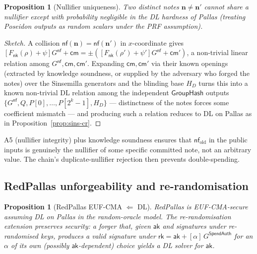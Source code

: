 \documentclass[11pt,a4paper]{article}
\newtheorem{proposition}[theorem]{Proposition}
\theoremstyle{definition}
\newcommand{\nfsym}{\mathsf{nf}}
\newcommand{\cmsym}{\mathsf{cm}}
\newcommand{\rk}{\mathsf{rk}}
\newcommand{\GroupHash}{\ensuremath{\mathsf{GroupHash}}}
\newcommand{\aksym}{\ensuremath{\mathsf{ak}}}
\newcommand{\nksym}{\ensuremath{\mathsf{nk}}}
\begin{document}
\begin{proposition}[Nullifier uniqueness]\label{prop:nf-unique}
Two distinct notes $\mathbf{n} \ne \mathbf{n}'$ cannot share a nullifier
except with probability negligible in the DL hardness of Pallas (treating
Poseidon outputs as random scalars under the PRF assumption).
\end{proposition}

\begin{proof}[Sketch]
A collision $\nfsym(\mathbf{n}) = \nfsym(\mathbf{n}')$ in $x$-coordinate
gives
$[F_{\nksym}(\rho) + \psi] G^{\mathsf{nf}} + \cmsym = \pm([F_{\nksym}(\rho') + \psi'] G^{\mathsf{nf}} + \cmsym')$,
a non-trivial linear relation among $G^{\mathsf{nf}}, \cmsym, \cmsym'$.
Expanding $\cmsym, \cmsym'$ via their known openings (extracted by
knowledge soundness, or supplied by the adversary who forged the notes)
over the Sinsemilla generators and the blinding base $H_D$ turns this into
a known non-trivial DL relation among the independent $\GroupHash$ outputs
$\{G^{\mathsf{nf}}, Q, P[0], \dots, P[2^k - 1], H_D\}$ --- distinctness of
the notes forces some coefficient mismatch --- and producing such a
relation reduces to DL on Pallas as in Proposition~\ref{prop:sins-cr}.
\end{proof}

A5 (nullifier integrity) plus knowledge soundness ensures that
$\nfsym_{\mathrm{old}}$ in the public inputs is genuinely the nullifier of
some specific committed note, not an arbitrary value. The chain's
duplicate-nullifier rejection then prevents double-spending.

\subsection{RedPallas unforgeability and re-randomisation}\label{sec:redpallas-sec}

\begin{proposition}[RedPallas EUF-CMA $\Leftarrow$ DL]\label{prop:redpallas}
RedPallas is EUF-CMA-secure assuming DL on Pallas in the random-oracle
model. The re-randomisation extension preserves security: a forger that,
given $\aksym$ and signatures under re-randomised keys, produces a valid
signature under $\rk = \aksym + [\alpha]\, G^{\mathsf{SpendAuth}}$ for an
$\alpha$ of its own (possibly $\aksym$-dependent) choice yields a DL
solver for $\aksym$.
\end{proposition}
\end{document}
